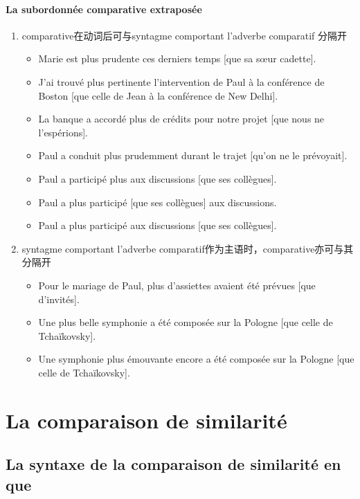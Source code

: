 \documentclass[UTF8]{report}
\begin{document}
\paragraph{La subordonnée comparative extraposée}
\begin{enumerate}
    \item comparative在动词后可与syntagme comportant l’adverbe comparatif 分隔开
    \begin{itemize}
        \item Marie est plus prudente ces derniers temps [que sa sœur cadette].
        \item J’ai trouvé plus pertinente l’intervention de Paul à la conférence de Boston [que celle de Jean à la conférence de New Delhi].
        \item La banque a accordé plus de crédits pour notre projet [que nous ne l’espérions].
        \item Paul a conduit plus prudemment durant le trajet [qu’on ne le prévoyait].
        \item Paul a participé plus aux discussions [que ses collègues].
        \item Paul a plus participé [que ses collègues] aux discussions.
        \item Paul a plus participé aux discussions [que ses collègues].
    \end{itemize}
    \item syntagme comportant l’adverbe comparatif作为主语时，comparative亦可与其分隔开
    \begin{itemize}
        \item Pour le mariage de Paul, plus d’assiettes avaient été prévues [que d’invités].
        \item Une plus belle symphonie a été composée sur la Pologne [que celle de Tchaïkovsky].
        \item Une symphonie plus émouvante encore a été composée sur la Pologne [que celle de Tchaïkovsky].
    \end{itemize}
\end{enumerate}



\section{La comparaison de similarité}
\subsection{La syntaxe de la comparaison de similarité en que}
\end{document}
